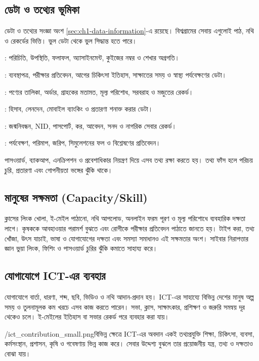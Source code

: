 \begin{topicbody}
\subsection{ডেটা ও তথ্যের ভূমিকা}
ডেটা ও তথ্যের সংজ্ঞা অংশ \ref{sec:ch1-data-information}-এ রয়েছে। বিশ্বগ্রামের সেবায় এগুলোই পাঠ, নথি ও রেকর্ডের ভিত্তি। ভুল ডেটা থেকে ভুল সিদ্ধান্ত হতে পারে।
\begin{compactpoints}
\item {}: পরিচিতি, উপস্থিতি, ফলাফল, অ্যাসাইনমেন্ট, কুইজের নম্বর ও শেখার অগ্রগতি।
\item {}: ব্যবস্থাপত্র, পরীক্ষার প্রতিবেদন, আগের চিকিৎসা ইতিহাস, সাক্ষাতের সময় ও স্বাস্থ্য পর্যবেক্ষণের ডেটা।
\item {}: পণ্যের তালিকা, অর্ডার, গ্রাহকের মতামত, মূল্য পরিশোধ, সরবরাহ ও মজুতের রেকর্ড।
\item {}: হিসাব, লেনদেন, মোবাইল ব্যাংকিং ও প্রতারণা শনাক্ত করার ডেটা।
\item {}: জন্মনিবন্ধন, NID, পাসপোর্ট, কর, আবেদন, সনদ ও নাগরিক সেবার রেকর্ড।
\item {}: পর্যবেক্ষণ, পরিমাপ, জরিপ, সিমুলেশনের ফল ও বিশ্লেষণের প্রতিবেদন।
\end{compactpoints}
পাসওয়ার্ড, ব্যাকআপ, এনক্রিপশন ও প্রবেশাধিকার নিয়ন্ত্রণ দিয়ে এসব তথ্য রক্ষা করতে হয়। তথ্য ফাঁস হলে পরিচয় চুরি, প্রতারণা এবং গোপনীয়তা ভঙ্গের ঝুঁকি থাকে।

\subsection{মানুষের সক্ষমতা (Capacity/Skill)}
ক্লাসের লিংক খোলা, ই-মেইল পাঠানো, নথি আপলোড, অনলাইন ফরম পূরণ ও মূল্য পরিশোধে ব্যবহারিক দক্ষতা লাগে। কৃষককে আবহাওয়ার পরামর্শ বুঝতে এবং রোগীকে পরীক্ষার প্রতিবেদন পাঠাতে জানতে হয়। টাইপ করা, তথ্য খোঁজা, উৎস যাচাই, ভাষা ও যোগাযোগের দক্ষতা এবং সমস্যা সমাধানও এই সক্ষমতার অংশ। সাইবার নিরাপত্তার জ্ঞান ভুয়া লিংক, ফিশিং ও পাসওয়ার্ড চুরির ঝুঁকি কমাতে সাহায্য করে।

\subsection{যোগাযোগে ICT-এর ব্যবহার}
যোগাযোগে বার্তা, ধারণা, শব্দ, ছবি, ভিডিও ও নথি আদান-প্রদান হয়। ICT-এর সাহায্যে বিভিন্ন দেশের মানুষ অল্প সময় ও তুলনামূলক কম খরচে এসব কাজ করতে পারেন। সভা, ক্লাস, সাক্ষাৎকার, প্রশিক্ষণ ও জরুরি সমন্বয় দূর থেকেও চলে। ই-মেইলের ইতিহাস বা সভার রেকর্ড পরে ব্যবহার করা যায়।
\begin{rightimageblock}{\chaponeimg/ict_contribution_small.png}{বিভিন্ন ক্ষেত্রে ICT-এর অবদান}
একই তথ্যপ্রযুক্তি শিক্ষা, চিকিৎসা, ব্যবসা, কর্মসংস্থান, প্রশাসন, কৃষি ও গবেষণায় ভিন্ন কাজ করে। সেবার উদ্দেশ্য বুঝলে তার প্রয়োজনীয় যন্ত্র, তথ্য ও দক্ষতাও বোঝা যায়।
\end{rightimageblock}\label{fig:ch1-pair-7}


\end{topicbody}
